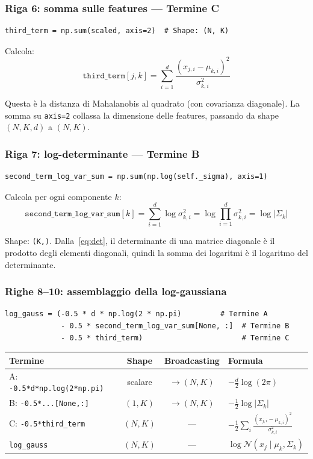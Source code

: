 \documentclass[11pt,a4paper]{article}
\begin{document}
\subsubsection{Riga 6: somma sulle features --- Termine C}
\begin{lstlisting}
third_term = np.sum(scaled, axis=2)  # Shape: (N, K)
\end{lstlisting}

Calcola:
\[
  \texttt{third\_term}[j,k] = \sum_{i=1}^{d}
  \frac{(x_{j,i}-\mu_{k,i})^2}{\sigma_{k,i}^2}
\]

Questa è la distanza di Mahalanobis al quadrato (con covarianza diagonale).
La somma su \texttt{axis=2} collassa la dimensione delle features,
passando da shape $(N,K,d)$ a $(N,K)$.

\subsubsection{Riga 7: log-determinante --- Termine B}
\begin{lstlisting}
second_term_log_var_sum = np.sum(np.log(self._sigma), axis=1)
\end{lstlisting}

Calcola per ogni componente $k$:
\[
  \texttt{second\_term\_log\_var\_sum}[k] = \sum_{i=1}^{d}
  \log \sigma_{k,i}^2 = \log \prod_{i=1}^{d} \sigma_{k,i}^2
  = \log |\Sigma_k|
\]

Shape: \texttt{(K,)}. Dalla~\eqref{eq:det}, il determinante di una
matrice diagonale è il prodotto degli elementi diagonali, quindi la
somma dei logaritmi è il logaritmo del determinante.

\subsubsection{Righe 8--10: assemblaggio della log-gaussiana}
\begin{lstlisting}
log_gauss = (-0.5 * d * np.log(2 * np.pi)         # Termine A
             - 0.5 * second_term_log_var_sum[None, :]  # Termine B
             - 0.5 * third_term)                       # Termine C
\end{lstlisting}

\begin{center}
\renewcommand{\arraystretch}{1.3}
\begin{tabular}{lccl}
\toprule
\textbf{Termine} & \textbf{Shape} & \textbf{Broadcasting} &
\textbf{Formula} \\
\midrule
A: \texttt{-0.5*d*np.log(2*np.pi)} & scalare & $\to (N,K)$ &
$-\frac{d}{2}\log(2\pi)$ \\
B: \texttt{-0.5*...[None,:]} & $(1,K)$ & $\to (N,K)$ &
$-\frac{1}{2}\log|\Sigma_k|$ \\
C: \texttt{-0.5*third\_term} & $(N,K)$ & --- &
$-\frac{1}{2}\sum_i\frac{(x_{j,i}-\mu_{k,i})^2}{\sigma_{k,i}^2}$ \\
\midrule
\texttt{log\_gauss} & $(N,K)$ & --- &
$\log\mathcal{N}(x_j \mid \mu_k,\Sigma_k)$ \\
\bottomrule
\end{tabular}
\end{center}
\end{document}
